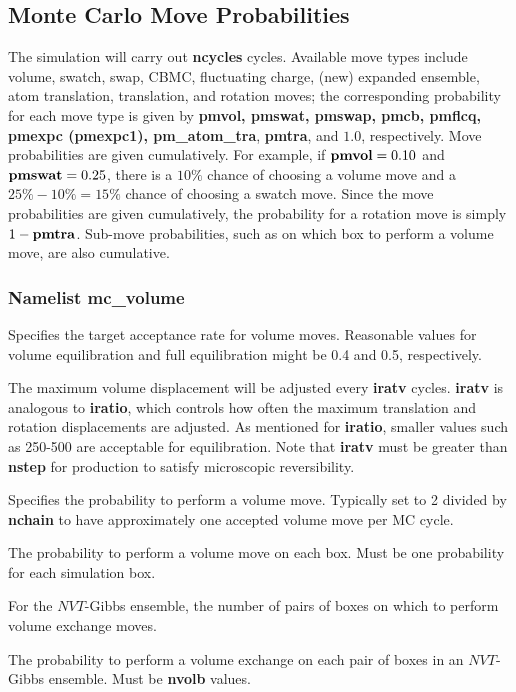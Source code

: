 \documentclass[12pt,letterpaper]{article}
\begin{document}
\subsection{Monte Carlo Move Probabilities}
The simulation will carry out {\bf ncycles} cycles.
Available move types include volume, swatch, swap, CBMC,
fluctuating charge, (new) expanded ensemble, atom
translation, translation, and rotation moves; the
corresponding probability for each move type is given by
{\bf pmvol, pmswat, pmswap, pmcb, pmflcq, pmexpc (pmexpc1),
  pm\_atom\_tra}, {\bf pmtra}, and $1.0$, respectively. Move
probabilities are given cumulatively. For example, if ${\bf
  pmvol} = 0.10$ and ${\bf pmswat} = 0.25$, there is a
$10\%$ chance of choosing a volume move and a $25\%-10\% =
15\%$ chance of choosing a swatch move. Since the move
probabilities are given cumulatively, the probability for a
rotation move is simply $1 - {\bf pmtra}$. Sub-move
probabilities, such as on which box to perform a volume
move, are also cumulative.

\subsubsection{Namelist \textbf{mc\_volume}}
 Specifies the target acceptance rate
for volume moves. Reasonable values for volume equilibration
and full equilibration might be 0.4 and 0.5, respectively.

 The maximum volume displacement will
be adjusted every {\bf iratv} cycles. {\bf iratv} is
analogous to {\bf iratio}, which controls how often the
maximum translation and rotation displacements are adjusted.
As mentioned for {\bf iratio}, smaller values such as
250-500 are acceptable for equilibration. Note that {\bf
  iratv} must be greater than {\bf nstep} for production to
satisfy microscopic reversibility.

 Specifies the probability to perform a
volume move. Typically set to 2 divided by {\bf nchain} to
have approximately one accepted volume move per MC cycle.

 The probability to perform a volume
move on each box. Must be one probability for each
simulation box.

 For the $NVT$-Gibbs ensemble, the
number of pairs of boxes on which to perform volume exchange
moves.

 The probability to perform a volume
exchange on each pair of boxes in an $NVT$-Gibbs ensemble.
Must be {\bf nvolb} values.
\end{document}
